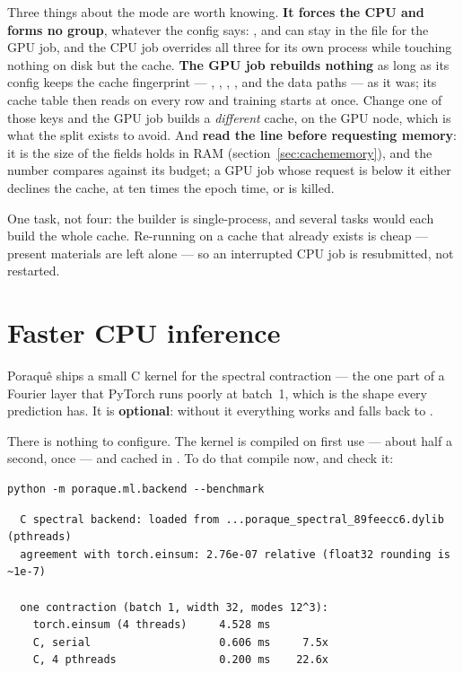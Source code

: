 Three things about the mode are worth knowing. \textbf{It forces the CPU and
forms no group}, whatever the config says: ,
 and  can stay in the file
for the GPU job, and the CPU job overrides all three for its own process while
touching nothing on disk but the cache. \textbf{The GPU job rebuilds nothing}
as long as its config keeps the cache fingerprint --- ,
, , ,
 and the data paths --- as it was; its cache table then
reads  on every row and training starts at once. Change one of
those keys and the GPU job builds a \emph{different} cache, on the GPU node,
which is what the split exists to avoid. And \textbf{read the 
line before requesting memory}: it is the size of the fields
 holds in RAM (section~\ref{sec:cachememory}), and
the number  compares against its budget; a GPU job whose request is
below it either declines the cache, at ten times the epoch time, or is killed.

One task, not four: the builder is single-process, and several tasks would
each build the whole cache. Re-running  on a cache that
already exists is cheap --- present materials are left alone --- so an
interrupted CPU job is resubmitted, not restarted.

\section{Faster CPU inference}
\label{sec:cbackend}

Poraqu\^e ships a small C kernel for the spectral contraction --- the one part
of a Fourier layer that PyTorch runs poorly at batch~1, which is the shape
every prediction has. It is \textbf{optional}: without it everything works and
falls back to .

There is nothing to configure. The kernel is compiled on first use --- about
half a second, once --- and cached in .
To do that compile now, and check it:

\begin{lstlisting}
python -m poraque.ml.backend --benchmark
\end{lstlisting}

\begin{lstlisting}
  C spectral backend: loaded from ...poraque_spectral_89feecc6.dylib (pthreads)
  agreement with torch.einsum: 2.76e-07 relative (float32 rounding is ~1e-7)

  one contraction (batch 1, width 32, modes 12^3):
    torch.einsum (4 threads)     4.528 ms
    C, serial                    0.606 ms     7.5x
    C, 4 pthreads                0.200 ms    22.6x
\end{lstlisting}

